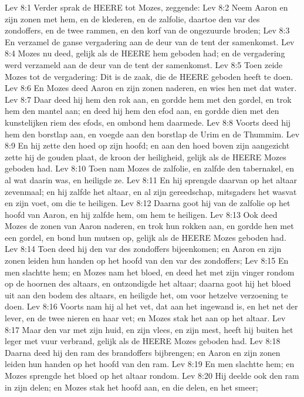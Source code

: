 Lev 8:1  Verder sprak de HEERE tot Mozes, zeggende:
Lev 8:2  Neem Aaron en zijn zonen met hem, en de klederen, en de zalfolie, daartoe den var des zondoffers, en de twee rammen, en den korf van de ongezuurde broden;
Lev 8:3  En verzamel de ganse vergadering aan de deur van de tent der samenkomst.
Lev 8:4  Mozes nu deed, gelijk als de HEERE hem geboden had; en de vergadering werd verzameld aan de deur van de tent der samenkomst.
Lev 8:5  Toen zeide Mozes tot de vergadering: Dit is de zaak, die de HEERE geboden heeft te doen.
Lev 8:6  En Mozes deed Aaron en zijn zonen naderen, en wies hen met dat water.
Lev 8:7  Daar deed hij hem den rok aan, en gordde hem met den gordel, en trok hem den mantel aan; en deed hij hem den efod aan, en gordde dien met den kunstelijken riem des efods, en ombond hem daarmede.
Lev 8:8  Voorts deed hij hem den borstlap aan, en voegde aan den borstlap de Urim en de Thummim.
Lev 8:9  En hij zette den hoed op zijn hoofd; en aan den hoed boven zijn aangezicht zette hij de gouden plaat, de kroon der heiligheid, gelijk als de HEERE Mozes geboden had.
Lev 8:10  Toen nam Mozes de zalfolie, en zalfde den tabernakel, en al wat daarin was, en heiligde ze.
Lev 8:11  En hij sprengde daarvan op het altaar zevenmaal; en hij zalfde het altaar, en al zijn gereedschap, mitsgaders het wasvat en zijn voet, om die te heiligen.
Lev 8:12  Daarna goot hij van de zalfolie op het hoofd van Aaron, en hij zalfde hem, om hem te heiligen.
Lev 8:13  Ook deed Mozes de zonen van Aaron naderen, en trok hun rokken aan, en gordde hen met een gordel, en bond hun mutsen op, gelijk als de HEERE Mozes geboden had.
Lev 8:14  Toen deed hij den var des zondoffers bijeenkomen; en Aaron en zijn zonen leiden hun handen op het hoofd van den var des zondoffers;
Lev 8:15  En men slachtte hem; en Mozes nam het bloed, en deed het met zijn vinger rondom op de hoornen des altaars, en ontzondigde het altaar; daarna goot hij het bloed uit aan den bodem des altaars, en heiligde het, om voor hetzelve verzoening te doen.
Lev 8:16  Voorts nam hij al het vet, dat aan het ingewand is, en het net der lever, en de twee nieren en haar vet; en Mozes stak het aan op het altaar.
Lev 8:17  Maar den var met zijn huid, en zijn vlees, en zijn mest, heeft hij buiten het leger met vuur verbrand, gelijk als de HEERE Mozes geboden had.
Lev 8:18  Daarna deed hij den ram des brandoffers bijbrengen; en Aaron en zijn zonen leiden hun handen op het hoofd van den ram.
Lev 8:19  En men slachtte hem; en Mozes sprengde het bloed op het altaar rondom.
Lev 8:20  Hij deelde ook den ram in zijn delen; en Mozes stak het hoofd aan, en die delen, en het smeer;
